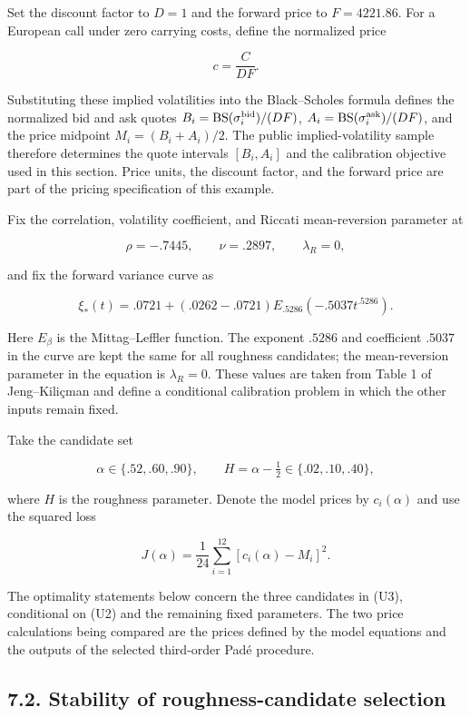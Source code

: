 \documentclass[a4paper,11pt]{article}
\begin{document}
Set the discount factor to $D=1$ and the forward price to $F=4221.86$. For a European call under zero carrying costs, define the normalized price

\[
c=\frac{C}{DF}.
\tag{U1}
\]

Substituting these implied volatilities into the Black–Scholes formula defines the normalized bid and ask quotes
$B_i=\operatorname{BS}(\sigma_i^{\rm bid})/(DF)$, $A_i=\operatorname{BS}(\sigma_i^{\rm ask})/(DF)$, and the price midpoint $M_i=(B_i+A_i)/2$. The public implied-volatility sample therefore determines the quote intervals $[B_i,A_i]$ and the calibration objective used in this section. Price units, the discount factor, and the forward price are part of the pricing specification of this example.

Fix the correlation, volatility coefficient, and Riccati mean-reversion parameter at

\[
\rho=-.7445,\qquad \nu=.2897,\qquad \lambda_R=0,
\]

and fix the forward variance curve as

\[
\xi_*(t)=.0721+(.0262-.0721)
E_{.5286}(-.5037t^{.5286}).
\tag{U2}
\]

Here $E_\beta$ is the Mittag–Leffler function. The exponent $.5286$ and coefficient $.5037$ in the curve are kept the same for all roughness candidates; the mean-reversion parameter in the equation is $\lambda_R=0$. These values are taken from Table 1 of Jeng–Kiliçman and define a conditional calibration problem in which the other inputs remain fixed.

Take the candidate set

\[
\alpha\in\{.52,.60,.90\},\qquad
H=\alpha-\tfrac12\in\{.02,.10,.40\},
\tag{U3}
\]

where $H$ is the roughness parameter. Denote the model prices by $c_i(\alpha)$ and use the squared loss

\[
J(\alpha)=\frac1{24}\sum_{i=1}^{12}[c_i(\alpha)-M_i]^2.
\tag{U4}
\]

The optimality statements below concern the three candidates in (U3), conditional on (U2) and the remaining fixed parameters. The two price calculations being compared are the prices defined by the model equations and the outputs of the selected third-order Padé procedure.

\subsection*{7.2. Stability of roughness-candidate selection}
\end{document}
